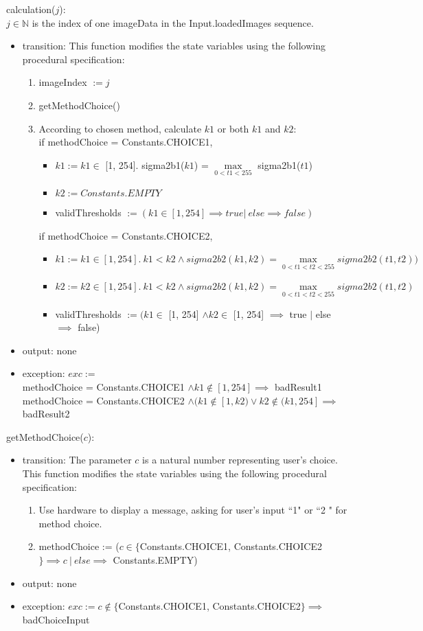 \documentclass[12pt, titlepage]{article}
\begin{document}
\noindent calculation($j$):\\
$j \in \mathbb{N}$ is the index of one imageData in the Input.loadedImages
sequence.
\begin{itemize}
\item transition:
This function modifies
the state variables using the following procedural specification:
\begin{enumerate}
    \item
    imageIndex $:= j$
    \item
    getMethodChoice()
    \item
    According to chosen method, calculate $k1$ or both $k1$ and $k2$:\\
    if methodChoice = Constants.CHOICE1,
\begin{itemize}
\item $k1 := k1 \in$ [1, 254]. sigma2b1($k1$) = $\max\limits_{0< t1<255}$
sigma2b1($t1$)
    \item $k2 := Constants.EMPTY$
\item validThresholds $:= (k1 \in [1, 254] \implies true |\ else \implies
false)$
\end{itemize}
if methodChoice = Constants.CHOICE2,
\begin{itemize}
\item $k1 := k1 \in [1, 254].\ k1 < k2 \land sigma2b2(k1,k2) =
\max\limits_{0<t1<t2<255} sigma2b2(t1,t2))$
\item $k2 := k2 \in [1, 254].\ k1 < k2 \land sigma2b2(k1,k2) =
\max\limits_{0<t1<t2<255} sigma2b2(t1,t2)$
\item validThresholds $:= (k1 \in$ [1, 254] $\land k2 \in$ [1, 254] $\implies$
true $|$ else $\implies$ false)
\end{itemize}
\end{enumerate}
\item output: none
\item exception: $exc :=$\\
methodChoice = Constants.CHOICE1 $\land k1 \not\in [1, 254] \implies$
badResult1\\
methodChoice = Constants.CHOICE2 $\land (k1 \not\in [1,k2) \lor k2 \not\in (k1,
254] \implies$ badResult2
\end{itemize}

\noindent getMethodChoice($c$):
\begin{itemize}
\item transition:
The parameter $c$ is a natural number representing user's choice. This function
modifies the state variables using the following procedural specification:
\begin{enumerate}
    \item
Use hardware to display a message, asking for user's input ``1" or ``2 " for
method choice.
    \item
methodChoice := ($c \in \{$Constants.CHOICE1, Constants.CHOICE2$\} \implies c\
|\ else \implies$ Constants.EMPTY)
\end{enumerate}
\item output: none
\item exception: $exc := c \not\in \{$Constants.CHOICE1, Constants.CHOICE2$\}
\implies$ badChoiceInput
\end{itemize}
\end{document}
